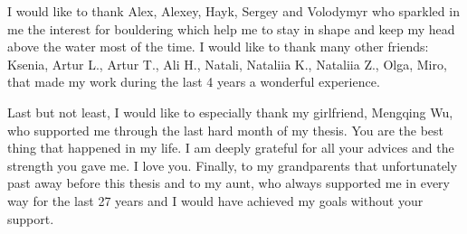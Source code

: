 I would like to thank Alex, Alexey, Hayk, Sergey and Volodymyr who sparkled in me the interest for bouldering which help me to stay in shape and keep my head above the water most of the time. I would like to thank many other friends: Ksenia, Artur L., Artur T., Ali H., Natali, Nataliia K., Nataliia Z., Olga, Miro, that made my work during the last 4 years a wonderful experience.

Last but not least, I would like to especially thank my girlfriend, Mengqing Wu, who supported me through the last hard month of my thesis. You are the best thing that happened in my life. I am deeply grateful for all your advices and the strength you gave me. I love you. Finally, to my grandparents that unfortunately past away before this thesis and to my aunt, who always supported me in every way for the last 27 years and I would have achieved my goals without your support.
